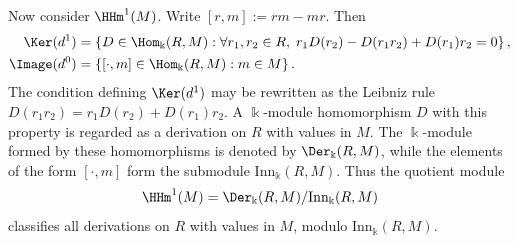 \begin{example}\label{eg:HH1}
	Now consider $\HHm^1(M)$. Write $[r,m]:=rm-mr$. Then
	\begin{align*}
		\Ker(d^1)
		&=\left\{D\in\Hom_{\Bbbk}(R,M):
		\forall r_1,r_2\in R,\;
		r_1D(r_2)-D(r_1r_2)+D(r_1)r_2=0\right\},\\
		\Image(d^0)
		&=\left\{[\mathord{\cdot},m]\in\Hom_{\Bbbk}(R,M):m\in M\right\}.
	\end{align*}
	The condition defining $\Ker(d^1)$ may be rewritten as the Leibniz rule
	$D(r_1r_2)=r_1D(r_2)+D(r_1)r_2$. A $\Bbbk$-module homomorphism $D$ with
	this property is regarded as a derivation on $R$ with values in $M$. The
	$\Bbbk$-module formed by these homomorphisms is denoted by
	$\Der_{\Bbbk}(R,M)$, while the elements of the form
	$[\mathord{\cdot},m]$ form the submodule
	$\mathrm{Inn}_{\Bbbk}(R,M)$. Thus the quotient module
	\[ \HHm^1(M)=\Der_{\Bbbk}(R,M)/\mathrm{Inn}_{\Bbbk}(R,M) \]
	classifies all derivations on $R$ with values in $M$, modulo
	$\mathrm{Inn}_{\Bbbk}(R,M)$.


\end{example}
